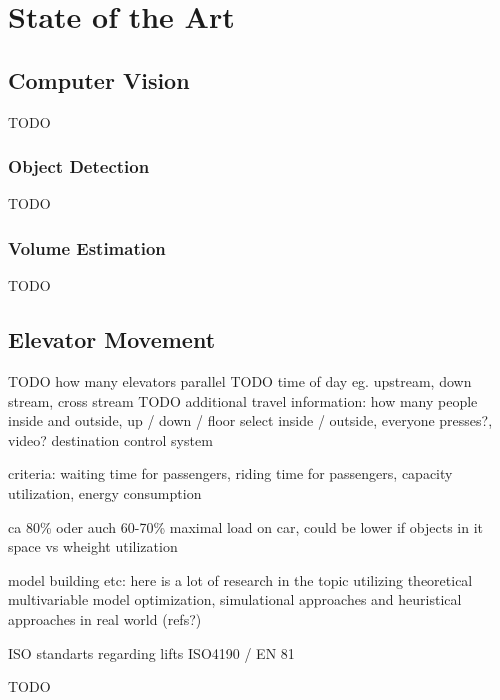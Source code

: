 \chapter{State of the Art}
\label{chap:sota}

\section{Computer Vision}

TODO

\subsection{Object Detection}

TODO

\subsection{Volume Estimation}

TODO

\section{Elevator Movement}
TODO how many elevators parallel
TODO time of day eg. upstream, down stream, cross stream
TODO additional travel information: how many people inside and outside, up / down / floor select inside / outside, everyone presses?, video? 
destination control system

criteria: waiting time for passengers, riding time for passengers, capacity utilization, energy consumption

ca 80\% oder auch 60-70\% maximal load on car, could be lower if objects in it
space vs wheight utilization

model building etc: here is a lot of research in the topic utilizing theoretical multivariable model optimization, simulational approaches and heuristical approaches in real world (refs?)

ISO standarts regarding lifts ISO4190 / EN 81

TODO
